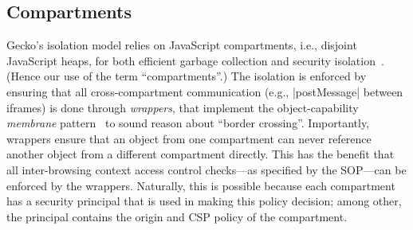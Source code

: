 \subsection{Compartments}
\begin{table}
\caption{Confining code from exfiltrating data using existing browser
mechanisms.}
\label{tab:comm}
\end{table}
 
Gecko's isolation model relies on JavaScript compartments, i.e.,
disjoint JavaScript heaps, for both efficient garbage collection and
security isolation~\cite{wagner2011compartmental}.
%
(Hence our use of the term ``compartments''.)
%
The isolation is enforced by ensuring that all cross-compartment
communication (e.g., \js|postMessage| between iframes) is done through
\emph{wrappers}, that implement the object-capability \emph{membrane}
pattern~\cite{miller2003paradigm,miller2006robust} to sound reason
about ``border crossing''. 
%
Importantly, wrappers ensure that an object from one compartment can
never reference another object from a different compartment directly.
%
This has the benefit that all inter-browsing context access control
checks---as specified by the SOP---can be enforced by the wrappers.
%
Naturally, this is possible because each compartment has a security
principal that is used in making this policy decision; among other,
the principal contains the origin and CSP policy of the compartment.

